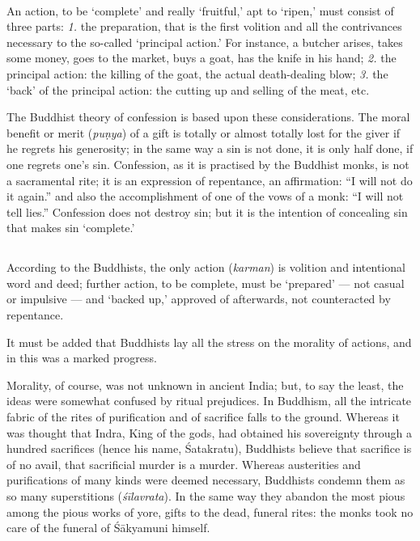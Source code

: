 \documentclass[a4paper, 11pt, oneside, english]{article}
\begin{document}
\paragraph{}
An action, to be `complete' and really `fruitful,' apt to `ripen,' must consist of three parts: \emph{1.} the preparation, that is the first volition and all the contrivances necessary to the so-called `principal action.' For instance, a butcher arises, takes some money, goes to the market, buys a goat, has the knife in his hand; \emph{2.} the principal action: the killing of the goat, the actual death-dealing blow; \emph{3.} the `back' of the principal action: the cutting up and selling of the meat, etc.

The Buddhist theory of confession is based upon these considerations. The moral benefit or merit (\emph{puṇya}) of a gift is totally or almost totally lost for the giver if he regrets his generosity; in the same way a sin is not done, it is only half done, if one regrets one's sin. Confession, as it is practised by the Buddhist monks, is not a sacramental rite; it is an expression of repentance, an affirmation: ``I will not do it again.'' and also the accomplishment of one of the vows of a monk: ``I will not tell lies.'' Confession does not destroy sin; but it is the intention of concealing sin that makes sin `complete.'

\subsection{}
\paragraph{}
According to the Buddhists, the only action (\emph{karman}) is volition and intentional word and deed; further action, to be complete, must be `prepared' --- not casual or impulsive --- and `backed up,' approved of afterwards, not counteracted by repentance.

It must be added that Buddhists lay all the stress on the morality of actions, and in this was a marked progress.

Morality, of course, was not unknown in ancient India; but, to say the least, the ideas were somewhat confused by ritual prejudices. In Buddhism, all the intricate fabric of the rites of purification and of sacrifice falls to the ground. Whereas it was thought that Indra, King of the gods, had obtained his sovereignty through a hundred sacrifices (hence his name, Śatakratu), Buddhists believe that sacrifice is of no avail, that sacrificial murder is a murder. Whereas austerities and purifications of many kinds were deemed necessary, Buddhists condemn them as so many superstitions (\emph{śīlavrata}). In the same way they abandon the most pious among the pious works of yore, gifts to the dead, funeral rites: the monks took no care of the funeral of Śākyamuni himself.
\end{document}
